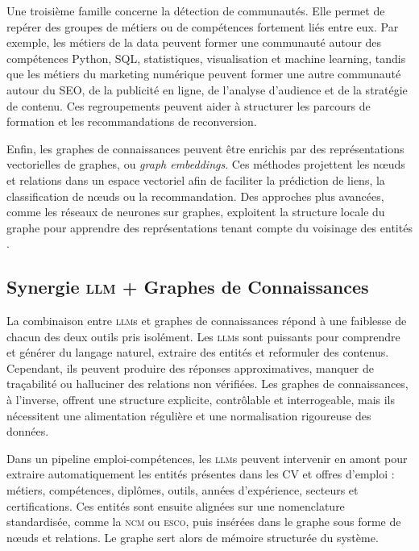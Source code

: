 \documentclass[12pt,twoside]{report}
\newcommand{\ESCO}{\textsc{esco}}
\newcommand{\NCM}{\textsc{ncm}}
\newcommand{\LLM}{\textsc{llm}}
\begin{document}
Une troisième famille concerne la détection de communautés. Elle permet de repérer des groupes de métiers ou de compétences fortement liés entre eux. Par exemple, les métiers de la data peuvent former une communauté autour des compétences Python, SQL, statistiques, visualisation et machine learning, tandis que les métiers du marketing numérique peuvent former une autre communauté autour du SEO, de la publicité en ligne, de l'analyse d'audience et de la stratégie de contenu. Ces regroupements peuvent aider à structurer les parcours de formation et les recommandations de reconversion.

Enfin, les graphes de connaissances peuvent être enrichis par des représentations vectorielles de graphes, ou \textit{graph embeddings}. Ces méthodes projettent les nœuds et relations dans un espace vectoriel afin de faciliter la prédiction de liens, la classification de nœuds ou la recommandation. Des approches plus avancées, comme les réseaux de neurones sur graphes, exploitent la structure locale du graphe pour apprendre des représentations tenant compte du voisinage des entités \cite{hogan2021knowledge,hamilton2020graph}.

 
\subsection{Synergie \LLM{} + Graphes de Connaissances}
La combinaison entre \LLM{}s et graphes de connaissances répond à une faiblesse de chacun des deux outils pris isolément. Les \LLM{}s sont puissants pour comprendre et générer du langage naturel, extraire des entités et reformuler des contenus. Cependant, ils peuvent produire des réponses approximatives, manquer de traçabilité ou halluciner des relations non vérifiées. Les graphes de connaissances, à l'inverse, offrent une structure explicite, contrôlable et interrogeable, mais ils nécessitent une alimentation régulière et une normalisation rigoureuse des données.

Dans un pipeline emploi-compétences, les \LLM{}s peuvent intervenir en amont pour extraire automatiquement les entités présentes dans les CV et offres d'emploi : métiers, compétences, diplômes, outils, années d'expérience, secteurs et certifications. Ces entités sont ensuite alignées sur une nomenclature standardisée, comme la \NCM{} ou \ESCO{}, puis insérées dans le graphe sous forme de nœuds et relations. Le graphe sert alors de mémoire structurée du système.
\end{document}
